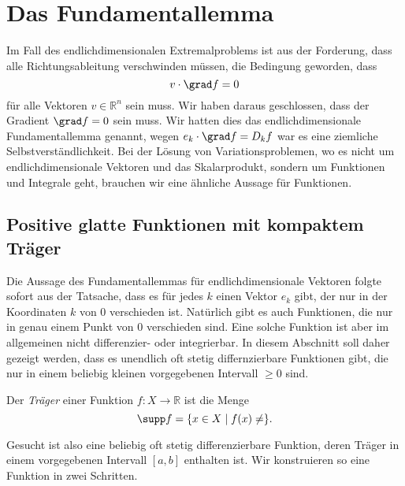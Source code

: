 %
%
%
\section{Das Fundamentallemma
\label{buch:variation:section:fundamentallemma}}
Im Fall des endlichdimensionalen Extremalproblems ist aus der
Forderung, dass alle Richtungsableitung verschwinden müssen, 
die Bedingung geworden, dass
\[
v\cdot\grad f = 0
\]
für alle Vektoren $v\in\mathbb{R}^n$ sein muss.
Wir haben daraus geschlossen, dass der Gradient $\grad f=0$
sein muss.
Wir hatten dies das endlichdimensionale Fundamentallemma genannt,
wegen $e_k\cdot \grad f = D_kf$ war es eine ziemliche Selbstverständlichkeit.
Bei der Lösung von Variationsproblemen, wo es nicht um endlichdimensionale
Vektoren und das Skalarprodukt, sondern um Funktionen und Integrale
geht, brauchen wir eine ähnliche Aussage für Funktionen.

%
%
\subsection{Positive glatte Funktionen mit kompaktem Träger
\label{buch:variation:fundamentallemma:subsection:positiv}}
Die Aussage des Fundamentallemmas für endlichdimensionale Vektoren 
folgte sofort aus der Tatsache, dass es für jedes $k$ einen Vektor
$e_k$ gibt, der nur in der Koordinaten $k$ von $0$ verschieden ist.
Natürlich gibt es auch Funktionen, die nur in genau einem Punkt
von $0$ verschieden sind.
Eine solche Funktion ist aber im allgemeinen nicht differenzier-
oder integrierbar.
In diesem Abschnitt soll daher gezeigt werden, dass es unendlich
oft stetig differnzierbare Funktionen gibt, die nur in einem beliebig
kleinen vorgegebenen Intervall $\ge 0$ sind.

\begin{definition}[Träger]
\label{buch:variation:def:traeger}
Der {\em Träger} einer Funktion $f\colon X\to\mathbb{R}$ ist die Menge
%
\[
\supp f = \{ x\in X\mid f(x)\ne \}.
\]
%
\end{definition}

Gesucht ist also eine beliebig oft stetig differenzierbare Funktion,
deren Träger in einem vorgegebenen Intervall $[a,b]$ enthalten ist.
Wir konstruieren so eine Funktion in zwei Schritten.



